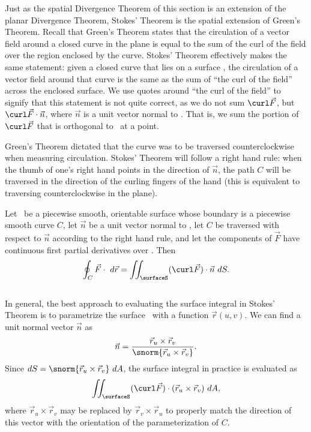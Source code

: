 Just as the spatial Divergence Theorem of this section is an extension of the planar Divergence Theorem, Stokes' Theorem is the spatial extension of Green's Theorem. Recall that Green's Theorem states that the circulation of a vector field around a closed curve in the plane is equal to the sum of the curl of the field over the region enclosed by the curve. Stokes' Theorem effectively makes the same statement: given a closed curve that lies on a surface \surfaceS, the circulation of a vector field around that curve is the same as the sum of ``the curl of the field'' across the enclosed surface. We use quotes around ``the curl of the field'' to signify that this statement is not quite correct, as we do not sum $\curl \vec F$, but $\curl \vec F\cdot\vec n$, where $\vec n$ is a unit vector normal to \surfaceS. That is, we sum the portion of $\curl \vec F$ that is orthogonal to \surfaceS\ at a point.

Green's Theorem dictated that the curve was to be traversed counterclockwise when measuring circulation. Stokes' Theorem will follow a right hand rule: when the thumb of one's right hand points in the direction of $\vec n$, the path $C$ will be traversed in the direction of the curling fingers of the hand (this is equivalent to traversing counterclockwise in the plane).

{Let \surfaceS\ be a piecewise smooth, orientable surface whose boundary is a piecewise smooth curve $C$, let $\vec n$ be a unit vector normal to \surfaceS, let $C$ be traversed with respect to $\vec n$ according to the right hand rule, and let the components of $\vec F$ have continuous first partial derivatives over \surfaceS. Then
$$\oint_C \vec F\cdot \ d\vec r = \iint_\surfaceS (\curl\vec F)\cdot \vec n\ dS.$$
}\\

In general, the best approach to evaluating the surface integral in Stokes' Theorem is to parametrize the surface \surfaceS\ with a function $\vec r(u,v)$. We can find a unit normal vector $\vec n$ as 
$$\vec n = \frac{\vec r_u\times\vec r_v}{\snorm{\vec r_u\times\vec r_v}}.$$
Since $dS = \snorm{\vec r_u\times\vec r_v}\ dA$, the surface integral in practice is evaluated as 
$$\iint_\surfaceS (\curl \vec F)\cdot (\vec r_u\times\vec r_v)\ dA,$$
where $\vec r_u\times\vec r_v$ may be replaced by $\vec r_v\times\vec r_u$ to properly match the direction of this vector with the orientation of the parameterization of $C$. \\

